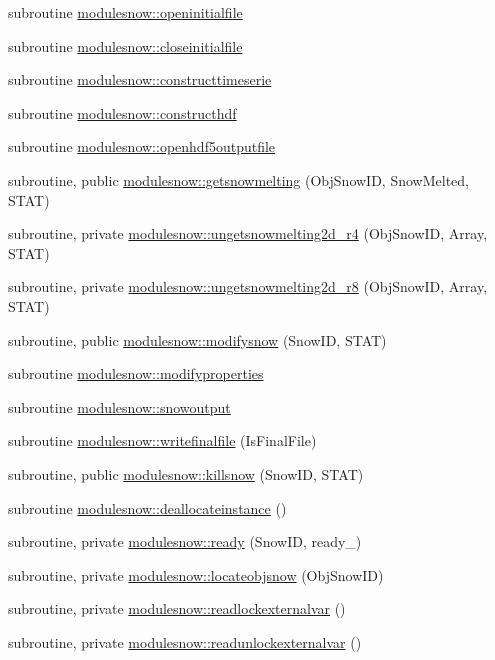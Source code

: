 \begin{DoxyCompactItemize}
\item 
subroutine \mbox{\hyperlink{namespacemodulesnow_a78835d47393c5328c084dddbc4457d6d}{modulesnow\+::openinitialfile}}
\item 
subroutine \mbox{\hyperlink{namespacemodulesnow_aab9a2dba663d0f96350797dd7fbd0923}{modulesnow\+::closeinitialfile}}
\item 
subroutine \mbox{\hyperlink{namespacemodulesnow_aad7eea4b66e4c45d4d4cc09cacabb4a4}{modulesnow\+::constructtimeserie}}
\item 
subroutine \mbox{\hyperlink{namespacemodulesnow_a83ff8967e79c730436ab635d92f70eaf}{modulesnow\+::constructhdf}}
\item 
subroutine \mbox{\hyperlink{namespacemodulesnow_a65a805e3fa668273a96e5a6c2f76644d}{modulesnow\+::openhdf5outputfile}}
\item 
subroutine, public \mbox{\hyperlink{namespacemodulesnow_a6d79f4685f7a014eb4967e32297c5f09}{modulesnow\+::getsnowmelting}} (Obj\+Snow\+ID, Snow\+Melted, S\+T\+AT)
\item 
subroutine, private \mbox{\hyperlink{namespacemodulesnow_ad46c82bdf9dd0bdd57a7edce05221094}{modulesnow\+::ungetsnowmelting2d\+\_\+r4}} (Obj\+Snow\+ID, Array, S\+T\+AT)
\item 
subroutine, private \mbox{\hyperlink{namespacemodulesnow_a042504d2eebab701131d198c2c1146d5}{modulesnow\+::ungetsnowmelting2d\+\_\+r8}} (Obj\+Snow\+ID, Array, S\+T\+AT)
\item 
subroutine, public \mbox{\hyperlink{namespacemodulesnow_a4bf35b96ab1a5b04412fedf95560ec5b}{modulesnow\+::modifysnow}} (Snow\+ID, S\+T\+AT)
\item 
subroutine \mbox{\hyperlink{namespacemodulesnow_aada914398244e3d136722b4c1c7a5abf}{modulesnow\+::modifyproperties}}
\item 
subroutine \mbox{\hyperlink{namespacemodulesnow_ab811c0f4d09e6ff82a7c0bc8b88a1503}{modulesnow\+::snowoutput}}
\item 
subroutine \mbox{\hyperlink{namespacemodulesnow_a4a825586dc688763fa3df8c6402fe6c3}{modulesnow\+::writefinalfile}} (Is\+Final\+File)
\item 
subroutine, public \mbox{\hyperlink{namespacemodulesnow_abd86d0a2403e7608f089a4ee16dab4e6}{modulesnow\+::killsnow}} (Snow\+ID, S\+T\+AT)
\item 
subroutine \mbox{\hyperlink{namespacemodulesnow_ac9029191079e3096a3bb36742e4d578f}{modulesnow\+::deallocateinstance}} ()
\item 
subroutine, private \mbox{\hyperlink{namespacemodulesnow_a63b7009f3649ad5fe78d70607da94054}{modulesnow\+::ready}} (Snow\+ID, ready\+\_\+)
\item 
subroutine, private \mbox{\hyperlink{namespacemodulesnow_abd7d9e3dda07461c69e66347c0a3d904}{modulesnow\+::locateobjsnow}} (Obj\+Snow\+ID)
\item 
subroutine, private \mbox{\hyperlink{namespacemodulesnow_ac0228c4a338498fe67a6c82ec745030c}{modulesnow\+::readlockexternalvar}} ()
\item 
subroutine, private \mbox{\hyperlink{namespacemodulesnow_aca134562eba09bf793fd35d399482672}{modulesnow\+::readunlockexternalvar}} ()
\end{DoxyCompactItemize}
